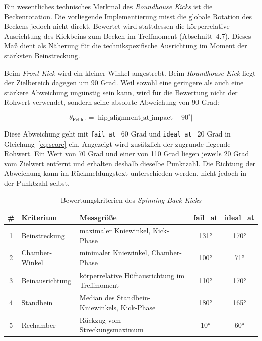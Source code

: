 \documentclass[intern]{cgMA}
\begin{document}
Ein wesentliches technisches Merkmal des \textit{Roundhouse Kicks} ist die Beckenrotation. Die vorliegende Implementierung misst die globale Rotation des Beckens jedoch nicht direkt. Bewertet wird stattdessen die körperrelative Ausrichtung des Kickbeins zum Becken im Treffmoment (Abschnitt~4.7). Dieses Maß dient als Näherung für die technikspezifische Ausrichtung im Moment der stärksten Beinstreckung.

Beim \textit{Front Kick} wird ein kleiner Winkel angestrebt. Beim \textit{Roundhouse Kick} liegt der Zielbereich dagegen um 90 Grad. Weil sowohl eine geringere als auch eine stärkere Abweichung ungünstig sein kann, wird für die Bewertung nicht der Rohwert verwendet, sondern seine absolute Abweichung von 90 Grad:

\begin{equation}
\theta_{\text{Fehler}} = \left|\text{hip\_alignment\_at\_impact} - 90^{\circ}\right|
\label{eq:rotationerror}
\end{equation}

Diese Abweichung geht mit \texttt{fail\_at}=60 Grad und \texttt{ideal\_at}=20 Grad in Gleichung~\ref{eq:score} ein. Angezeigt wird zusätzlich der zugrunde liegende Rohwert. Ein Wert von 70 Grad und einer von 110 Grad liegen jeweils 20 Grad vom Zielwert entfernt und erhalten deshalb dieselbe Punktzahl. Die Richtung der Abweichung kann im Rückmeldungstext unterschieden werden, nicht jedoch in der Punktzahl selbst.

\begin{table}[htbp]
\centering
\small
\begin{tabular}{c p{} p{} c c}
\hline
\# & \textbf{Kriterium} & \textbf{Messgröße} & \textbf{fail\_at} & \textbf{ideal\_at} \\ \hline
1 & Beinstreckung & maximaler Kniewinkel, Kick-Phase & 131° & 170° \\
2 & Chamber-Winkel & minimaler Kniewinkel, Chamber-Phase & 100° & 71° \\
3 & Beinausrichtung & körperrelative Hüftausrichtung im Treffmoment & 110° & 170° \\
4 & Standbein & Median des Standbein-Kniewinkels, Kick-Phase & 180° & 165° \\
5 & Rechamber & Rückzug vom Streckungsmaximum & 10° & 60° \\ \hline
\end{tabular}
\caption{Bewertungskriterien des \textit{Spinning Back Kicks}}
\label{tab:crit_dwit}
\end{table}
\end{document}
